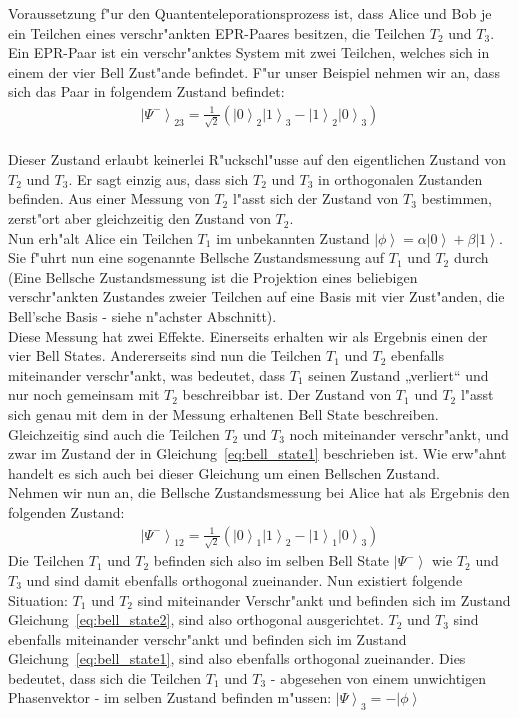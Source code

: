 \begin{refsection}
Voraussetzung f"ur den Quantenteleporationsprozess ist, dass Alice und Bob je ein Teilchen eines verschr"ankten EPR-Paares besitzen, die Teilchen $T_{2}$ und $T_{3}$. Ein EPR-Paar ist ein verschr"anktes System mit zwei Teilchen, welches sich in einem der vier Bell Zust"ande befindet. F"ur unser Beispiel nehmen wir an, dass sich das Paar in folgendem Zustand befindet:
\begin{align}\label{eq:bell_state1}
\left|\Psi^{-}\right\rangle_{23} = \frac{1}{\sqrt{2}} ( \left|0\right\rangle_{2}\left|1\right\rangle_{3} - \left|1\right\rangle_{2}\left|0\right\rangle_{3} )
\end{align}
\\
Dieser Zustand erlaubt keinerlei R"uckschl"usse auf den eigentlichen Zustand von $T_{2}$ und $T_{3}$. Er sagt einzig aus, dass sich $T_{2}$ und $T_{3}$ in orthogonalen Zustanden befinden. Aus einer Messung von $T_{2}$ l"asst sich der Zustand von $T_{3}$ bestimmen, zerst"ort aber gleichzeitig den Zustand von $T_{2}$. 
\\
Nun erh"alt Alice ein Teilchen $T_{1}$ im unbekannten Zustand $\left|\phi\right\rangle = \alpha\left|0\right\rangle + \beta\left|1\right\rangle$. Sie f"uhrt nun eine sogenannte Bellsche Zustandsmessung auf $T_{1}$ und $T_{2}$ durch (Eine Bellsche Zustandsmessung ist die Projektion eines beliebigen verschr"ankten Zustandes zweier Teilchen auf eine Basis mit vier Zust"anden, die Bell’sche Basis - siehe n"achster Abschnitt). 
\\
Diese Messung hat zwei Effekte. Einerseits erhalten wir als Ergebnis einen der vier Bell States. Andererseits sind nun die Teilchen $T_{1}$ und $T_{2}$ ebenfalls miteinander verschr"ankt, was bedeutet, dass $T_{1}$ seinen Zustand „verliert“ und nur noch gemeinsam mit $T_{2}$ beschreibbar ist. Der Zustand von $T_{1}$ und $T_{2}$ l"asst sich genau mit dem in der Messung erhaltenen Bell State beschreiben. Gleichzeitig sind auch die Teilchen $T_{2}$ und $T_{3}$ noch miteinander verschr"ankt, und zwar im Zustand der in Gleichung~\ref{eq:bell_state1} beschrieben ist. Wie erw"ahnt handelt es sich auch bei dieser Gleichung um einen Bellschen Zustand.
\\
Nehmen wir nun an, die Bellsche Zustandsmessung bei Alice hat als Ergebnis den folgenden Zustand:
\begin{align}\label{eq:bell_state2}
\left|\Psi^{-}\right\rangle_{12} = \frac{1}{\sqrt{2}} ( \left|0\right\rangle_{1}\left|1\right\rangle_{2} - \left|1\right\rangle_{1}\left|0\right\rangle_{3} )
\end{align}
Die Teilchen $T_{1}$ und $T_{2}$ befinden sich also im selben Bell State $\left| \Psi^{-} \right \rangle$ wie $T_{2}$ und $T_{3}$ und sind damit ebenfalls orthogonal zueinander. Nun existiert folgende Situation: $T_{1}$ und $T_{2}$ sind miteinander Verschr"ankt und befinden sich im Zustand Gleichung~\ref{eq:bell_state2}, sind also orthogonal ausgerichtet. $T_{2}$ und $T_{3}$ sind ebenfalls miteinander verschr"ankt und befinden sich im Zustand Gleichung~\ref{eq:bell_state1}, sind also ebenfalls orthogonal zueinander. Dies bedeutet, dass sich die Teilchen $T_{1}$ und $T_{3}$ - abgesehen von einem unwichtigen Phasenvektor - im selben Zustand befinden m"ussen: $\left| \Psi\right\rangle_{3} = -\left|\phi\right\rangle$

\end{refsection}
